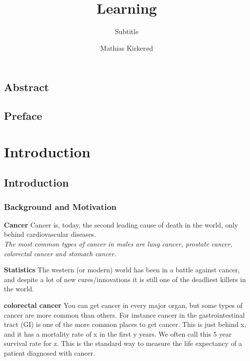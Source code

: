 \documentclass[a4paper,english]{ifimaster}
\title{Learning}
\subtitle{Subtitle}
\author{Mathias Kirkerød}
\begin{document}
\duoforside[dept={Department of Informatics},
program={Informatics: Language and Communication},
long]

\frontmatter{}
\chapter*{Abstract}

\tableofcontents{}
\listoffigures{}
\listoftables{}

\chapter*{Preface}

\mainmatter{}






















\part{Introduction}
\chapter{Introduction}
	\section{Background and Motivation}
	\textbf{Cancer}
	Cancer is, today, the second leading cause of death in the world, only behind 
	cardiovascular diseases.\\ %
	\textit{The most common types of cancer in males are lung cancer, prostate cancer, colorectal cancer and stomach cancer.\cite{stewart2014world}}
	\vspace{10px}
	
	\textbf{Statistics}
	The western (or modern) world has been in a battle against cancer, and despite a 
	lot of new cures/innovations it is still one of the deadliest killers in the world. 
	
	
	\vspace{10px}
	\textbf{colorectal cancer}
	You can get cancer in every major organ, but some types of cancer are more common than others.
	For instance cancer in the gastrointestinal tract (GI) is one of the more common places 
	to get cancer. This is just behind x, and it has a mortality rate of x in the first y years. %
	We often call this 5 year survival rate for z. This is the standard way to measure the life expectancy of a patient diagnosed with cancer. 
	
\end{document}
